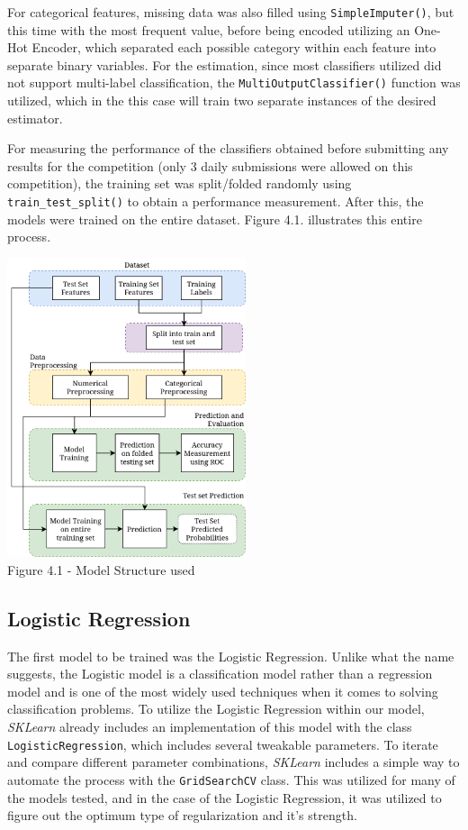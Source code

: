 \documentclass{IEEEtran}
\begin{document}
For categorical features, missing data was also filled using \texttt{SimpleImputer()}, but this time with the most frequent value, before being encoded utilizing an One-Hot Encoder, which separated each possible category within each feature into separate binary variables.
For the estimation, since most classifiers utilized did not support multi-label classification, the \texttt{MultiOutputClassifier()} function was utilized, which in the this case will train two separate instances of the desired estimator.

For measuring the performance of the classifiers obtained before submitting any results for the competition (only 3 daily submissions were allowed on this competition), the training set was split/folded randomly using \texttt{train\_test\_split()} to obtain a performance measurement. After this, the models were trained on the entire dataset. Figure 4.1. illustrates this entire process.

\begin{center}
    \includegraphics[width=7cm]{figures/MethodologyStructure.png}\\
    Figure 4.1 - Model Structure used
\end{center}

\subsection{Logistic Regression}
The first model to be trained was the Logistic Regression. Unlike what the name suggests, the Logistic model is a classification model rather than a regression model and is one of the most widely used techniques when it comes to solving classification problems. %
To utilize the Logistic Regression within our model, \textit{SKLearn} already includes an implementation of this model with the class \texttt{LogisticRegression}, which includes several tweakable parameters. To iterate and compare different parameter combinations, \textit{SKLearn} includes a simple way to automate the process with the \texttt{GridSearchCV} class. This was utilized for many of the models tested, and in the case of the Logistic Regression, it was utilized to figure out the optimum type of regularization and it's strength.
\end{document}
